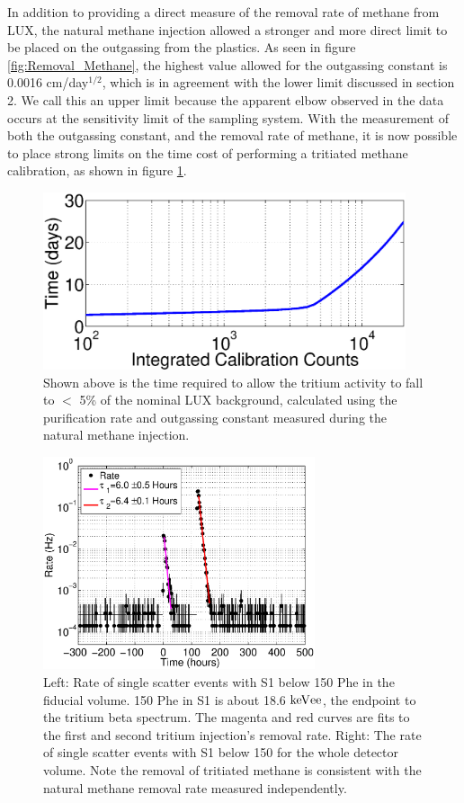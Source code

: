 In addition to providing a direct measure of the removal rate of methane from LUX, the natural methane injection allowed a stronger and more direct limit to be placed on the outgassing from the plastics. As seen in figure \ref{fig:Removal_Methane}, the highest value allowed for the outgassing constant is 0.0016 cm/day$^{1/2}$, which is in agreement with the lower limit discussed in section 2. We call this an upper limit because the apparent elbow observed in the data occurs at the sensitivity limit of the sampling system. With the measurement of both the outgassing constant, and the removal rate of methane, it is now possible to place strong limits on the time cost of performing a tritiated methane calibration, as shown in figure \ref{fig:cal_time}.

\begin{figure}[h!]
\centering
\includegraphics[width=0.95\textwidth]{Calibration_length.eps}
\caption{Shown above is the time required to allow the tritium activity to fall to $<$ 5\% of the nominal LUX background, calculated using the purification rate and outgassing constant measured during the natural methane injection. }
\label{fig:cal_time}
\end{figure}

\begin{figure}[h!]\centering
\includegraphics[width=80mm]{CH3T_Rate_fid_150_Run03_Tritium_Rate.eps}
\caption{Left: Rate of single scatter events with S1 below 150 Phe in the fiducial volume. 150 Phe in S1 is about 18.6 $\rm keV{ee}$, the endpoint to the tritium beta spectrum. The magenta and red curves are fits to the first and second tritium injection's removal rate. Right: The rate of single scatter events with S1 below 150 for the whole detector volume. Note the removal of tritiated methane is consistent with the natural methane removal rate measured independently.}
\label{fig:Removal}
\end{figure}




